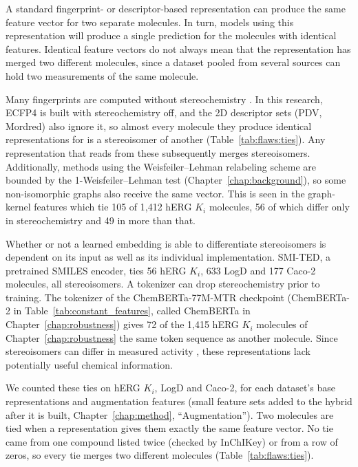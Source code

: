 A standard fingerprint- or descriptor-based representation can produce the same feature vector for two separate molecules. In turn, models using this representation will produce a single prediction for the molecules with identical features. Identical feature vectors do not always mean that the representation has merged two different molecules, since a dataset pooled from several sources can hold two measurements of the same molecule.

Many fingerprints are computed without stereochemistry \citep{orsi2024map4c}. In this research, ECFP4 is built with stereochemistry off, and the 2D descriptor sets (PDV, Mordred) also ignore it, so almost every molecule they produce identical representations for is a stereoisomer of another (Table~\ref{tab:flaws:ties}). Any representation that reads from these subsequently merges stereoisomers. Additionally, methods using the Weisfeiler--Lehman relabeling scheme are bounded by the 1-Weisfeiler--Lehman test (Chapter~\ref{chap:background}), so some non-isomorphic graphs also receive the same vector. This is seen in the graph-kernel features which tie 105 of 1,412 hERG $K_i$ molecules, 56 of which differ only in stereochemistry and 49 in more than that. 

Whether or not a learned embedding is able to differentiate stereoisomers is dependent on its input as well as its individual implementation. SMI-TED, a pretrained SMILES encoder, ties 56 hERG $K_i$, 633 LogD and 177 Caco-2 molecules, all stereoisomers. A tokenizer can drop stereochemistry prior to training. The tokenizer of the ChemBERTa-77M-MTR checkpoint (ChemBERTa-2 in Table~\ref{tab:constant_features}, called ChemBERTa in Chapter~\ref{chap:robustness}) gives 72 of the 1,415 hERG $K_i$ molecules of Chapter~\ref{chap:robustness} the same token sequence as another molecule. Since stereoisomers can differ in measured activity \citep{Nguyen2006}, these representations lack potentially useful chemical information. 

We counted these ties on hERG $K_i$, LogD and Caco-2, for each dataset's base representations and augmentation features (small feature sets added to the hybrid after it is built, Chapter~\ref{chap:method}, ``Augmentation''). Two molecules are tied when a representation gives them exactly the same feature vector. No tie came from one compound listed twice (checked by InChIKey) or from a row of zeros, so every tie merges two different molecules (Table~\ref{tab:flaws:ties}).

